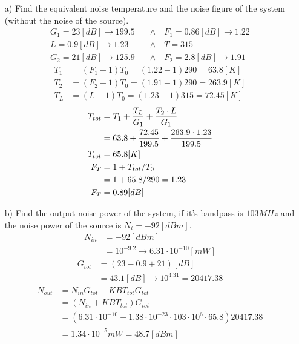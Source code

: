 \documentclass[12pt, letterpaper]{article}
\begin{document}
\begin{itemize}
  \item [a)] Find the equivalent noise temperature and the noise figure of the system (without the noise of the source).
  \begin{align}
    G_1
    =
    23[dB]
    \rightarrow
    199.5
    \quad&\wedge\quad
    F_1
    =
    0.86[dB]
    \rightarrow
    1.22
    \\
    L
    =
    0.9[dB]
    \rightarrow
    1.23
    \quad&\wedge\quad
    T
    =
    315
    \\
    G_2
    =
    21[dB]
    \rightarrow
    125.9
    \quad&\wedge\quad
    F_2
    =
    2.8[dB]
    \rightarrow
    1.91
  \end{align}
  \begin{align}
    T_1
    &=
    (F_1-1)T_0
    =
    (1.22-1)290=63.8[K]
    \\
    T_2
    &=
    (F_2-1)T_0
    =
    (1.91-1)290=263.9[K]
    \\
    T_L
    &=
    (L-1)T_0
    =
    (1.23-1)315=72.45[K]
  \end{align}
  \begin{align}
    T_{tot}
    &=
    T_1
    +
    {T_L\over G_1}
    +
    {T_2\cdot L\over G_1}
    \\
    &=
    63.8
    +
    {72.45\over 199.5}
    +
    {263.9\cdot 1.23\over 199.5}
    \\
    T_{tot}
    &=
    65.8[K]
    \\
    F_T
    &=
    1+T_{tot}/T_0
    \\
    &=
    1
    +
    65.8/290
    =
    1.23
    \\
    F_T
    &=
    0.89[dB]
  \end{align}
  \item [b)] Find the output noise power of the system, if it's bandpass is $103 MHz$ and the noise power of the source is $N_i = -92[dBm]$.
  \begin{align}
    N_{in}
    &=
    -92[dBm]
    \\
    &=
    10^{-9.2}
    \rightarrow
    6.31\cdot10^{-10}[mW]
  \end{align}
  \begin{align}
    G_{tot}
    &=
    (23-0.9+21)[dB]
    \\
    &=
    43.1[dB]
    \rightarrow
    10^{4.31}
    =20417.38
  \end{align}
  \begin{align}
    N_{out}
    &=
    N_{in}G_{tot}
    +
    KBT_{tot}G_{tot}
    \\
    &=
    (
    N_{in}
    +
    KBT_{tot})G_{tot}
    \\
    &=
    (
    6.31\cdot 10^{-10}
    +
    1.38\cdot10^{-23}\cdot103\cdot10^6\cdot65.8)20417.38
    \\
    &=
    1.34\cdot10^{-5}mW
    =
    48.7[dBm]
  \end{align}
\end{itemize}
\end{document}
